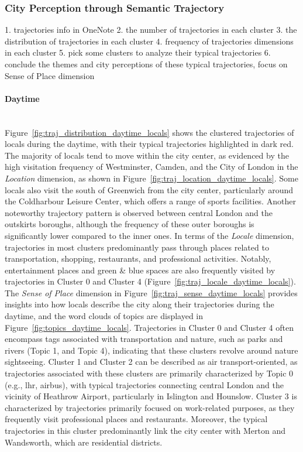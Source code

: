 \documentclass{article}
\newcommand{\subsubsubsection}[1]{\paragraph{#1}\mbox{}\\}
\theoremstyle{definition}
\theoremstyle{remark}
\begin{document}
\subsubsection{City Perception through Semantic Trajectory} \label{perception_through_traj}

1. trajectories info in OneNote
2. the number of trajectories in each cluster
3. the distribution of trajectories in each cluster
4. frequency of trajectories dimensions in each cluster
5. pick some clusters to analyze their typical trajectories
6. conclude the themes and city perceptions of these typical trajectories, focus on Sense of Place dimension

\subsubsubsection{Daytime}
Figure~\ref{fig:traj_distribution_daytime_locals} shows the clustered trajectories of locals during the daytime, with their typical trajectories highlighted in dark red. The majority of locals tend to move within the city center, as evidenced by the high visitation frequency of Westminster, Camden, and the City of London in the \textit{Location} dimension, as shown in Figure~\ref{fig:traj_location_daytime_locals}. Some locals also visit the south of Greenwich from the city center, particularly around the Coldharbour Leisure Center, which offers a range of sports facilities. Another noteworthy trajectory pattern is observed between central London and the outskirts boroughs, although the frequency of these outer boroughs is significantly lower compared to the inner ones. In terms of the \textit{Locale} dimension, trajectories in most clusters predominantly pass through places related to transportation, shopping, restaurants, and professional activities. Notably, entertainment places and green \& blue spaces are also frequently visited by trajectories in Cluster 0 and Cluster 4 (Figure~\ref{fig:traj_locale_daytime_locals}). The \textit{Sense of Place} dimension in Figure~\ref{fig:traj_sense_daytime_locals} provides insights into how locals describe the city along their trajectories during the daytime, and the word clouds of topics are displayed in Figure~\ref{fig:topics_daytime_locals}. Trajectories in Cluster 0 and Cluster 4 often encompass tags associated with transportation and nature, such as parks and rivers (Topic 1, and Topic 4), indicating that these clusters revolve around nature sightseeing. Cluster 1 and Cluster 2 can be described as air transport-oriented, as trajectories associated with these clusters are primarily characterized by Topic 0 (e.g., lhr, airbus), with typical trajectories connecting central London and the vicinity of Heathrow Airport, particularly in Islington and Hounslow. Cluster 3 is characterized by trajectories primarily focused on work-related purposes, as they frequently visit professional places and restaurants. Moreover, the typical trajectories in this cluster predominantly link the city center with Merton and Wandsworth, which are residential districts.
\end{document}
